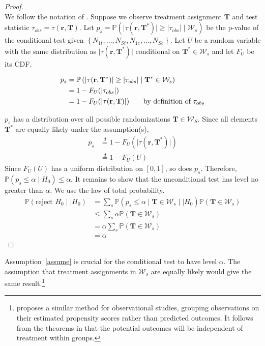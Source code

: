 \documentclass[12pt]{article}
\newcommand{\pr}{\mathbb{P}} %
\begin{document}
\begin{proof}
~\\
We follow the notation of \citet{hennessy_conditional_2015}.
Suppose we observe treatment assignment $\mathbf{T}$ and test statistic $\tau_{obs} = \tau(\mathbf{r}, \mathbf{T})$.
Let $p_s = \pr\left( \lvert \tau(\mathbf{r}, \mathbf{T}^*) \rvert \geq \lvert \tau_{obs} \rvert \mid \mathcal{W}_s \right)$ be the p-value of the conditional test given $\left\lbrace N_{1t}, \dots, N_{St}, N_{1c}, \dots, N_{Sc}\right\rbrace$.
Let $U$ be a random variable with the same distribution as $ \lvert \tau(\mathbf{r}, \mathbf{T}^*) \rvert$ conditional on $\mathbf{T}^* \in \mathcal{W}_s$ and let $F_U$ be its CDF.

\begin{align*}
p_s &= \pr\left( \lvert \tau(\mathbf{r}, \mathbf{T}^*) \rvert \geq \lvert \tau_{obs} \rvert \mid \mathbf{T}^* \in \mathcal{W}_s \right) \\
&= 1- F_U(\lvert \tau_{obs} \rvert) \\
&= 1- F_U(\lvert \tau(\mathbf{r}, \mathbf{T}) \rvert) \tag*{by definition of $\tau_{obs}$}
\end{align*}

\noindent $p_s$ has a distribution over all possible randomizations $\mathbf{T} \in \mathcal{W}_S$.
Since all elements $\mathbf{T}^*$ are equally likely under the assumption(s), 
\begin{align*}
p_s &\stackrel{d}{=} 1- F_U(\lvert \tau(\mathbf{r}, \mathbf{T}^*) \rvert) \\
&\stackrel{d}{=} 1 - F_U(U) 
\end{align*}
Since $F_U(U)$ has a uniform distribution on $[0, 1]$, so does $p_s$.
Therefore, $\pr(p_s \leq \alpha \mid H_0) \leq \alpha$. 
It remains to show that the unconditional test has level no greater than $\alpha$.
We use the law of total probability.
\begin{align*}
\pr(\text{reject $H_0$} \mid\mid H_0) &= \sum_{s} \pr(p_s \leq \alpha \mid \mathbf{T} \in \mathcal{W}_s\mid\mid H_0) \pr(\mathbf{T} \in \mathcal{W}_s) \\
&\leq \sum_{s} \alpha \pr(\mathbf{T} \in \mathcal{W}_s) \\
&= \alpha \sum_{s}  \pr(\mathbf{T} \in \mathcal{W}_s) \\
&= \alpha
\end{align*}
\end{proof}
Assumption~\ref{assume} is crucial for the conditional test to have level $\alpha$.
The assumption that treatment assignments in $\mathcal{W}_s$ are equally likely would give the same result.\footnote{
\citet{rosenbaum_covariance_2002} proposes a similar method for observational studies, grouping observations on their estimated propensity scores rather than predicted outcomes.
It follows from the theorems in \citet{rosenbaum_central_1983} that the potential outcomes will be independent of treatment within groups.
}
\end{document}
